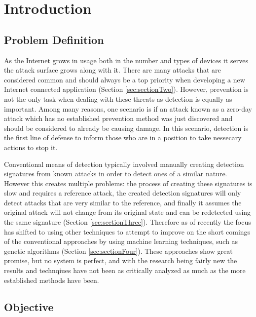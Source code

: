 \chapter{Introduction}
\section{Problem Definition}\label{sec:probDefinition}

As the Internet grows in usage both in the number and types of devices it serves the attack surface grows along with it.  There are many attacks that are considered common and should always be a top priority when developing a new Internet connected application (Section \ref{sec:sectionTwo}).  However, prevention is not the only task when dealing with these threats as detection is equally as important.  Among many reasons, one scenario is if an attack known as a zero-day attack which has no established prevention method was just discovered and should be considered to already be causing damage.  In this scenario, detection is the first line of defense to inform those who are in a position to take nessecary actions to stop it.  

Conventional means of detection typically involved manually creating detection signatures from known attacks in order to detect ones of a similar nature.  However this creates multiple problems: the process of creating these signatures is slow and requires a reference attack, the created detection signatures will only detect attacks that are very similar to the reference, and finally it assumes the original attack will not change from its original state and can be redetected using the same signature (Section \ref{sec:sectionThree}).  Therefore as of recently the focus has shifted to using other techniques to attempt to improve on the short comings of the conventional approaches by using machine learning techniques, such as genetic algorithms (Section \ref{sec:sectionFour}).  These approaches show great promise, but no system is perfect, and with the research being fairly new the results and technqiues have not been as critically analyzed as much as the more established methods have been.

\section{Objective}\label{sec:objectives}

